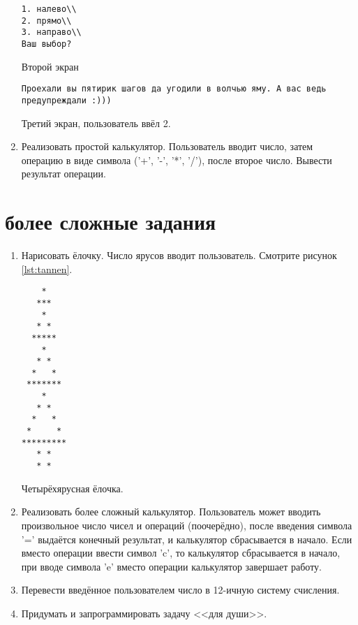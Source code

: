 \documentclass[12pt]{article}
\begin{document}
\begin{enumerate}
\begin{listing}[H]
\begin{verbatim}
1. налево\\
2. прямо\\
3. направо\\
Ваш выбор?
\end{verbatim}
\caption{Второй экран}
\label{lst:secondSC}
\end{listing}
\begin{listing}[H]
\begin{verbatim}
Проехали вы пятирик шагов да угодили в волчью яму. А вас ведь предупреждали :)))
\end{verbatim}
\caption{Третий экран, пользователь ввёл 2.}
\label{lst:thirdSC}
\end{listing}
  \item Реализовать простой калькулятор. Пользователь вводит число, затем операцию в виде символа ('+', '-', '*', '/'), после второе число. Вывести результат операции.
 \end{enumerate}
 
 \section{более сложные задания}
 \begin{enumerate}
  \item Нарисовать ёлочку. Число ярусов вводит пользователь. Смотрите рисунок \ref{lst:tannen}.
\begin{listing}[H]
\begin{center}
\begin{verbatim}
    *
   ***
    *
   * *
  *****
    *
   * *
  *   *
 *******
    *
   * *
  *   *
 *     *
*********
   * *
   * *
\end{verbatim}
\end{center}

\caption{Четырёхярусная ёлочка.}
\label{lst:tannen}
\end{listing}

  \item Реализовать более сложный калькулятор. Пользователь может вводить произвольное число чисел и операций 
  (поочерёдно), после введения символа '=' выдаётся конечный результат, и калькулятор сбрасывается в начало. Если 
вместо операции ввести символ 'c', то калькулятор сбрасывается в начало, при вводе символа 'e' вместо операции 
калькулятор завершает работу.
 \item Перевести введённое пользователем число в 12-ичную систему счисления.
 \item Придумать и запрограммировать задачу <<для души>>.
 \end{enumerate}
\end{document}
